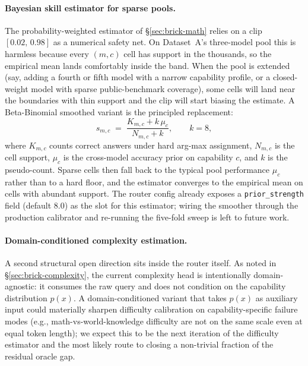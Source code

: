 \documentclass[twocolumn,10pt,a4paper]{article}
\begin{document}
\paragraph{Bayesian skill estimator for sparse pools.} The probability-weighted estimator of §\ref{sec:brick-math} relies on a clip $[0.02,\,0.98]$ as a numerical safety net. On Dataset~A's three-model pool this is harmless because every $(m,c)$ cell has support in the thousands, so the empirical mean lands comfortably inside the band. When the pool is extended (say, adding a fourth or fifth model with a narrow capability profile, or a closed-weight model with sparse public-benchmark coverage), some cells will land near the boundaries with thin support and the clip will start biasing the estimate. A Beta-Binomial smoothed variant is the principled replacement:
\[
  s_{m,c} \;=\; \frac{K_{m,c} + k\,\mu_c}{N_{m,c} + k}, \qquad k = 8,
\]
where $K_{m,c}$ counts correct answers under hard arg-max assignment, $N_{m,c}$ is the cell support, $\mu_c$ is the cross-model accuracy prior on capability $c$, and $k$ is the pseudo-count. Sparse cells then fall back to the typical pool performance $\mu_c$ rather than to a hard floor, and the estimator converges to the empirical mean on cells with abundant support. The router config already exposes a \texttt{prior\_strength} field (default $8.0$) as the slot for this estimator; wiring the smoother through the production calibrator and re-running the five-fold sweep is left to future work.

\paragraph{Domain-conditioned complexity estimation.} A second structural open direction sits inside the router itself. As noted in §\ref{sec:brick-complexity}, the current complexity head is intentionally domain-agnostic: it consumes the raw query and does not condition on the capability distribution $p(x)$. A domain-conditioned variant that takes $p(x)$ as auxiliary input could materially sharpen difficulty calibration on capability-specific failure modes (e.g., math-vs-world-knowledge difficulty are not on the same scale even at equal token length); we expect this to be the next iteration of the difficulty estimator and the most likely route to closing a non-trivial fraction of the residual oracle gap.
\end{document}
